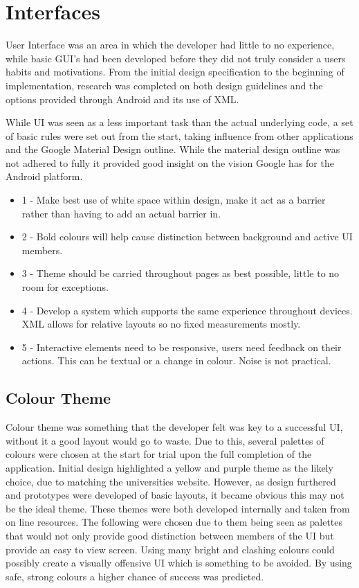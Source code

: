 \section{Interfaces}
User Interface was an area in which the developer had little to no experience, while basic GUI's had been developed before they did not truly consider a users habits and motivations. From the initial design specification to the beginning of implementation, research was completed on both design guidelines and the options provided through Android and its use of XML. 

While UI was seen as a less important task than the actual underlying code, a set of basic rules were set out from the start, taking influence from other applications and the Google Material Design outline\cite{material}. While the material design outline was not adhered to fully it provided good insight on the vision Google has for the Android platform. 


\begin{itemize}
	\item 1 - Make best use of white space within design, make it act as a barrier rather than having to add an actual barrier in.
	\item 2 - Bold colours will help cause distinction between background and active UI members.
	\item 3 - Theme should be carried throughout pages as best possible, little to no room for exceptions. 
	\item 4 - Develop a system which supports the same experience throughout devices. XML allows for relative layouts so no fixed measurements mostly. 
	\item 5 - Interactive elements need to be responsive, users need feedback on their actions. This can be textual or a change in colour. Noise is not practical. 
\end{itemize}
\newpage
\subsection{Colour Theme}
Colour theme was something that the developer felt was key to a successful UI, without it a good layout would go to waste. Due to this, several palettes of colours were chosen at the start for trial upon the full completion of the application. Initial design highlighted a yellow and purple theme as the likely choice, due to matching the universities website. However, as design furthered and prototypes were developed of basic layouts, it became obvious this may not be the ideal theme. These themes were both developed internally and taken from on line resources. The following were chosen due to them being seen as palettes that would not only provide good distinction between members of the UI but provide an easy to view screen. Using many bright and clashing colours could possibly create a visually offensive UI which is something to be avoided. By using safe, strong colours a higher chance of success was predicted. 

